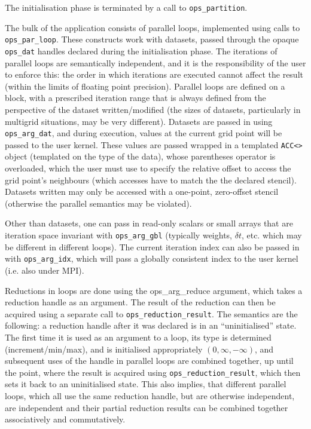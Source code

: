 \documentclass[11pt]{article}
\begin{document}
{The initialisation phase is terminated by a call to {\tt ops\_partition}.

The bulk of the application consists of parallel loops, implemented using calls to {\tt ops\_par\_loop}. These constructs work with datasets, passed through the opaque {\tt ops\_dat} handles declared during the initialisation phase. The iterations of parallel loops are semantically independent, and it is the responsibility of the user to enforce this: the order in which iterations are executed cannot affect the result (within the limits of floating point precision). Parallel loops are defined on a block, with a prescribed iteration range that is always defined from the perspective of the dataset written/modified (the sizes of datasets, particularly in multigrid situations, may be very different). Datasets are passed in using {\tt ops\_arg\_dat}, and during execution, values at the current grid point will be passed to the user kernel. These values are passed wrapped in a templated {\tt ACC<>} object (templated on the type of the data), whose parentheses operator is overloaded, which the user must use to specify the relative offset to access the grid point's neighbours (which accesses have to match the the declared stencil). Datasets written may only be accessed with a one-point, zero-offset stencil (otherwise the parallel semantics may be violated).

Other than datasets, one can pass in read-only scalars or small arrays that are iteration space invariant with {\tt ops\_arg\_gbl} (typically weights, $\delta t$, etc. which may be different in different loops). The current iteration index can also be passed in with {\tt ops\_arg\_idx}, which will pass a globally consistent index to the user kernel (i.e. also under MPI).

Reductions in loops are done using the ops\_arg\_reduce argument, which takes a reduction handle as an argument. The result of the reduction can then be acquired using a separate call to {\tt ops\_reduction\_result}. The semantics are the following: a reduction handle after it was declared is in an ``uninitialised'' state. The first time it is used as an argument to a loop, its type is determined (increment/min/max), and is initialised appropriately $(0,\infty,-\infty)$, and subsequent uses of the handle in parallel loops are combined together, up until the point, where the result is acquired using {\tt ops\_reduction\_result}, which then sets it back to an uninitialised state. This also implies, that different parallel loops, which all use the same reduction handle, but are otherwise independent, are independent and their partial reduction results can be combined together associatively and commutatively. 

}
\end{document}
